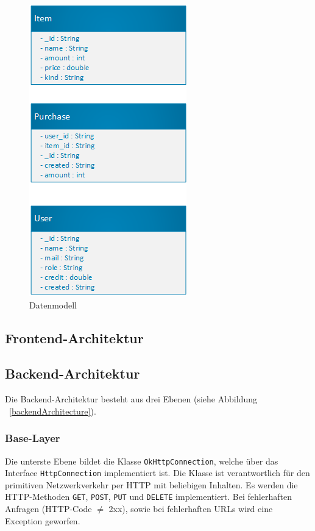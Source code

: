 \documentclass{scrartcl}
\begin{document}
	\begin{figure}[!h]
		\centering
		\includegraphics[scale=0.5]{./figures/datamodel.png}
		\caption{Datenmodell}
		\label{datamodel}
	\end{figure}

	\subsection{Frontend-Architektur}\label{subsec:frontend}

	\subsection{Backend-Architektur}\label{subsec:backend}

	Die Backend-Architektur besteht aus drei Ebenen (siehe Abbildung ~\ref{backendArchitecture}).

	\subsubsection{Base-Layer}

	Die unterste Ebene bildet die Klasse \texttt{OkHttpConnection}, welche über das Interface \texttt{HttpConnection} implementiert ist.
	Die Klasse ist verantwortlich für den primitiven Netzwerkverkehr per HTTP mit beliebigen Inhalten.
	Es werden die HTTP-Methoden \texttt{GET}, \texttt{POST}, \texttt{PUT} und \texttt{DELETE} implementiert.
	Bei fehlerhaften Anfragen (HTTP-Code $\neq$ 2xx), sowie bei fehlerhaften URLs wird eine Exception geworfen.
\end{document}
